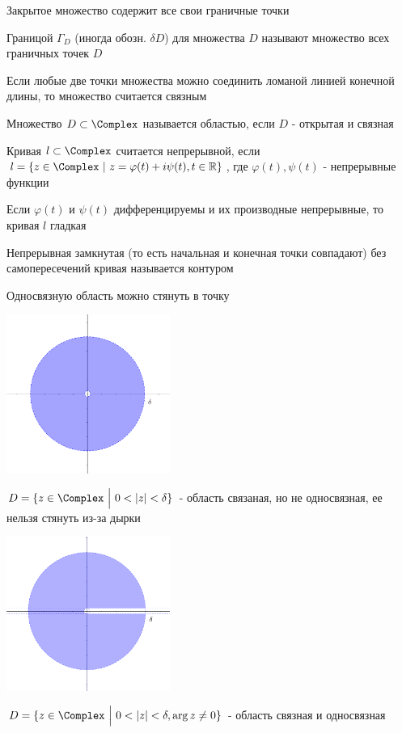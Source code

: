 \documentclass[12pt]{article}
\begin{document}
\Defs Закрытое множество содержит все свои граничные точки

\Defs Границой $\Gamma_D$ (иногда обозн. $\delta D$) для множества $D$ называют множество всех граничных точек $D$

\Defs Если любые две точки множества можно соединить ломаной линией конечной длины, то множество считается связным

\Defs Множество $D \subset \Complex$ называется областью, если $D$ - открытая и связная

\Defs Кривая $l \subset \Complex$ считается непрерывной, если $l = \{z \in \Complex \ | \ z = \varphi(t) + i \psi(t), t \in \Real\}$, где $\varphi(t), \psi(t)$ - непрерывные функции

\Notas Если $\varphi(t)$ и $\psi(t)$ дифференцируемы и их производные непрерывные, то кривая $l$ гладкая

\Defs Непрерывная замкнутая (то есть начальная и конечная точки совпадают) без самопересечений кривая называется контуром

\Notas Односвязную область можно стянуть в точку


\begin{multicols}{2}
    \includegraphics[width=0.4\textwidth]{addchapters2/images/addchapters2_2025_02_07_1}

     $D = \{z \in \Complex \ \Big| \ 0 < |z| < \delta\}$ - область связаная, но не односвязная, ее нельзя стянуть из-за дырки

    \mediumvspace

    \includegraphics[width=0.4\textwidth]{addchapters2/images/addchapters2_2025_02_07_2}

     $D = \{z \in \Complex \ \Big| \ 0 < |z| < \delta, \arg z \neq 0\}$ - область связная и односвязная
\end{multicols}
\end{document}
